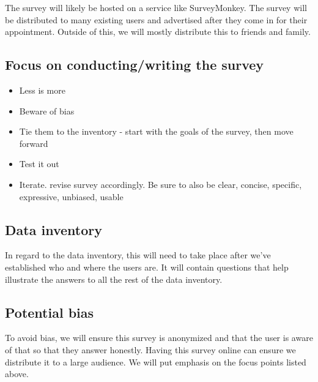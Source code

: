The survey will likely be hosted on a service like SurveyMonkey. The survey will be distributed to many existing users and advertised after they come in for their appointment. Outside of this, we will mostly distribute this to friends and family.

\subsection{Focus on conducting/writing the survey}
\begin{itemize}
\item
  Less is more
\item
  Beware of bias
\item
  Tie them to the inventory - start with the goals of the survey, then move forward
\item
  Test it out
\item
  Iterate. revise survey accordingly. Be sure to also be clear, concise, specific, expressive, unbiased, usable
\end{itemize}

\subsection{Data inventory}
In regard to the data inventory, this will need to take place after we've established who and where the users are. It will contain questions that help illustrate the answers to all the rest of the data inventory.

\subsection{Potential bias}
To avoid bias, we will ensure this survey is anonymized and that the user is aware of that so that they answer honestly. Having this survey online can ensure we distribute it to a large audience. We will put emphasis on the focus points listed above.


